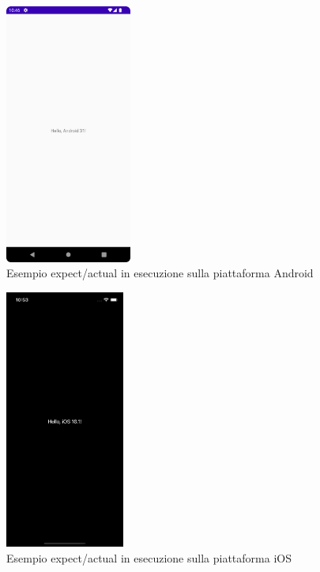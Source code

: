 \newpage
\begin{multicols}{2}
    \begin{figure}[H]
        \includegraphics[width=0.37\textwidth]{img/kmm_example_android.png}
        \caption{Esempio expect/actual in esecuzione sulla piattaforma Android}
        \label{expect-actual-android}
    \end{figure}

    \begin{figure}[H]
        \includegraphics[width=0.35\textwidth]{img/kmm_example_ios_dark.png}
        \caption{Esempio expect/actual in esecuzione sulla piattaforma iOS}
        \label{expect-actual-ios}
    \end{figure}
\end{multicols}

